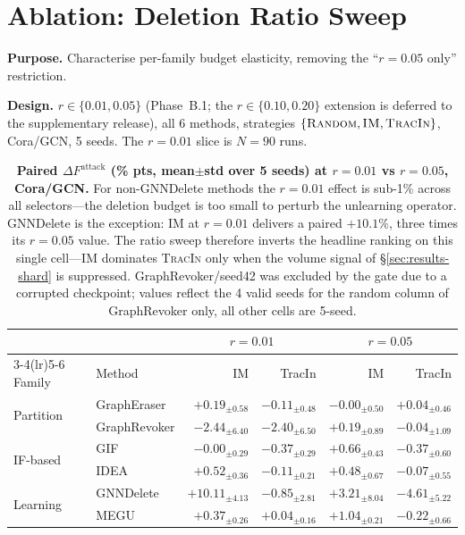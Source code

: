 \section{Ablation: Deletion Ratio Sweep}
\label{app:ratio}

\textbf{Purpose.} Characterise per-family budget elasticity, removing
the ``$r{=}0.05$ only'' restriction.

\textbf{Design.} $r\in\{0.01,0.05\}$ (Phase~B.1; the
$r\in\{0.10,0.20\}$ extension is deferred to the supplementary
release), all 6 methods, strategies
$\{\textsc{Random}, \textsc{IM}, \textsc{TracIn}\}$, Cora/GCN,
5 seeds. The $r{=}0.01$ slice is $N{=}90$ runs.

\begin{table}[h]
\centering
\footnotesize
\setlength{\tabcolsep}{5pt}
\caption{\textbf{Paired $\Delta F^{\mathrm{attack}}$ (\% pts,
mean$\pm$std over 5 seeds) at $r{=}0.01$ vs $r{=}0.05$, Cora/GCN.}
For non-GNNDelete methods the $r{=}0.01$ effect is sub-1\% across
all selectors---the deletion budget is too small to perturb the
unlearning operator. GNNDelete is the exception: \textsc{IM} at
$r{=}0.01$ delivers a paired $+10.1\%$, three times its $r{=}0.05$
value. The ratio sweep therefore inverts the headline ranking on
this single cell---\textsc{IM} dominates \textsc{TracIn} only when
the volume signal of \S\ref{sec:results-shard} is suppressed.
GraphRevoker/seed42 was excluded by the gate due to a corrupted
checkpoint; values reflect the 4 valid seeds for the random column
of GraphRevoker only, all other cells are 5-seed.}
\label{tab:ratio-sweep}
\begin{tabular}{@{}llrrrr@{}}
\toprule
& & \multicolumn{2}{c}{$r{=}0.01$} & \multicolumn{2}{c}{$r{=}0.05$} \\
\cmidrule(lr){3-4}\cmidrule(lr){5-6}
Family & Method & IM & TracIn & IM & TracIn \\
\midrule
\multirow{2}{*}{Partition}
 & GraphEraser  & $+0.19_{\pm 0.58}$ & $-0.11_{\pm 0.48}$ & $-0.00_{\pm 0.50}$ & $+0.04_{\pm 0.46}$ \\
 & GraphRevoker & $-2.44_{\pm 6.40}$ & $-2.40_{\pm 6.50}$ & $+0.19_{\pm 0.89}$ & $-0.04_{\pm 1.09}$ \\
\midrule
\multirow{2}{*}{IF-based}
 & GIF  & $-0.00_{\pm 0.29}$ & $-0.37_{\pm 0.29}$ & $+0.66_{\pm 0.43}$ & $-0.37_{\pm 0.60}$ \\
 & IDEA & $+0.52_{\pm 0.36}$ & $-0.11_{\pm 0.21}$ & $+0.48_{\pm 0.67}$ & $-0.07_{\pm 0.55}$ \\
\midrule
\multirow{2}{*}{Learning}
 & GNNDelete & $\mathbf{+10.11}_{\pm 4.13}$ & $-0.85_{\pm 2.81}$ & $+3.21_{\pm 8.04}$ & $-4.61_{\pm 5.22}$ \\
 & MEGU      & $+0.37_{\pm 0.26}$ & $+0.04_{\pm 0.16}$ & $+1.04_{\pm 0.21}$ & $-0.22_{\pm 0.66}$ \\
\bottomrule
\end{tabular}
\end{table}

